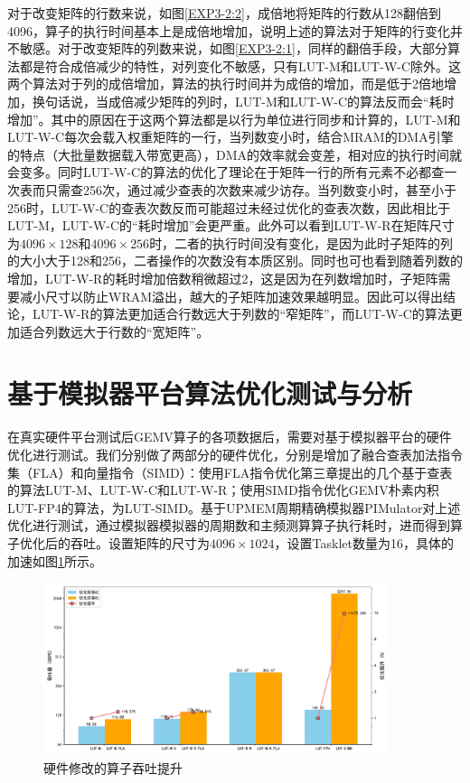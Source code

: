 对于改变矩阵的行数来说，如图\ref{EXP3-2:2}，成倍地将矩阵的行数从128翻倍到4096，算子的执行时间基本上是成倍地增加，说明上述的算法对于矩阵的行变化并不敏感。对于改变矩阵的列数来说，如图\ref{EXP3-2:1}，同样的翻倍手段，大部分算法都是符合成倍减少的特性，对列变化不敏感，只有LUT-M和LUT-W-C除外。这两个算法对于列的成倍增加，算法的执行时间并为成倍的增加，而是低于2倍地增加，换句话说，当成倍减少矩阵的列时，LUT-M和LUT-W-C的算法反而会“耗时增加”。其中的原因在于这两个算法都是以行为单位进行同步和计算的，LUT-M和LUT-W-C每次会载入权重矩阵的一行，当列数变小时，结合MRAM的DMA引擎的特点（大批量数据载入带宽更高），DMA的效率就会变差，相对应的执行时间就会变多。同时LUT-W-C的算法的优化了理论在于矩阵一行的所有元素不必都查一次表而只需查256次，通过减少查表的次数来减少访存。当列数变小时，甚至小于256时，LUT-W-C的查表次数反而可能超过未经过优化的查表次数，因此相比于LUT-M，LUT-W-C的“耗时增加”会更严重。此外可以看到LUT-W-R在矩阵尺寸为$4096\times 128$和$4096\times 256$时，二者的执行时间没有变化，是因为此时子矩阵的列的大小大于128和256，二者操作的次数没有本质区别。同时也可也看到随着列数的增加，LUT-W-R的耗时增加倍数稍微超过2，这是因为在列数增加时，子矩阵需要减小尺寸以防止WRAM溢出，越大的子矩阵加速效果越明显。因此可以得出结论，LUT-W-R的算法更加适合行数远大于列数的“窄矩阵”，而LUT-W-C的算法更加适合列数远大于行数的“宽矩阵”。

\section{基于模拟器平台算法优化测试与分析}
在真实硬件平台测试后GEMV算子的各项数据后，需要对基于模拟器平台的硬件优化进行测试。我们分别做了两部分的硬件优化，分别是增加了融合查表加法指令集（FLA）和向量指令（SIMD）：使用FLA指令优化第三章提出的几个基于查表的算法LUT-M、LUT-W-C和LUT-W-R；使用SIMD指令优化GEMV朴素内积LUT-FP4的算法，为LUT-SIMD。基于UPMEM周期精确模拟器PIMulator对上述优化进行测试，通过模拟器模拟器的周期数和主频测算算子执行耗时，进而得到算子优化后的吞吐。设置矩阵的尺寸为$4096\times 1024$，设置Tasklet数量为16，具体的加速如图\ref{EXP2-1}所示。

\begin{figure}[!htbp]
    \centering
    \includegraphics[width=0.9\textwidth]{figures/Exp2-1.pdf}
    \caption{硬件修改的算子吞吐提升}
	\label{EXP2-1}
\end{figure}

